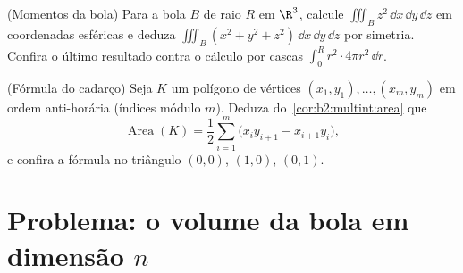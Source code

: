 \begin{exercise}[$\star\star$]\label{exo:b2:multint:11}
(Momentos da bola) Para a bola $B$ de raio $R$ em
$\R^3$, calcule $\iiint_B z^2\,\dd x\,\dd y\,\dd z$ em
coordenadas esféricas e deduza $\iiint_B (x^2 + y^2 +
z^2)\,\dd x\,\dd y\,\dd z$ por simetria. Confira o
último resultado contra o cálculo por cascas $\int_0^R r^2\cdot4\pi
r^2\,\dd r$.
\end{exercise}

\begin{exercise}[$\star\star$]\label{exo:b2:multint:12}
(Fórmula do cadarço) Seja $K$ um polígono de vértices $(x_1,
y_1), \dots, (x_m, y_m)$ em ordem anti-horária (índices
módulo $m$). Deduza do~\cref{cor:b2:multint:area} que
\[
\operatorname{Area}(K)
= \frac12\sum_{i=1}^m
\bigl(x_iy_{i+1} - x_{i+1}y_i\bigr) ,
\]
e confira a fórmula no triângulo $(0,0)$, $(1,0)$,
$(0,1)$.
\end{exercise}

\section{Problema: o volume da bola em dimensão $n$}

